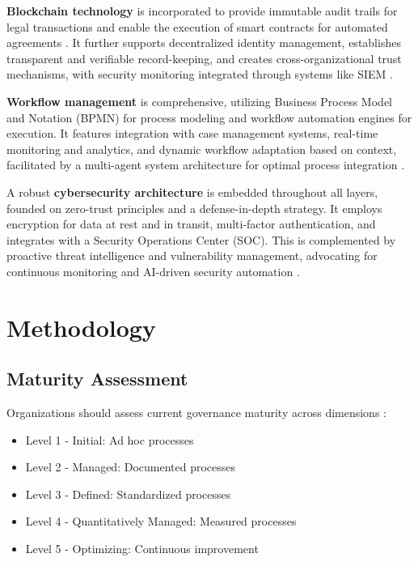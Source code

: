 \documentclass{IET-Conf-Paper}
\begin{document}
    \textbf{Blockchain technology }is incorporated to provide immutable audit trails for legal transactions and enable the execution of smart contracts for automated agreements \cite{nurudeen2024}. 
    It further supports decentralized identity management, establishes transparent and verifiable record-keeping, and creates cross-organizational trust mechanisms, with security monitoring integrated through systems like SIEM \cite{Khairiyah2025Ambidextrous}.
    
    \textbf{Workflow management} is comprehensive, utilizing Business Process Model and Notation (BPMN) for process modeling and workflow automation engines for execution. It features integration with case management systems, real-time monitoring and analytics, and dynamic workflow adaptation based on context, facilitated by a multi-agent system architecture for optimal process integration \cite{Soukaina_Elhasnaoui_2014}.
    
    A robust \textbf{cybersecurity architecture} is embedded throughout all layers, founded on zero-trust principles and a defense-in-depth strategy. It employs encryption for data at rest and in transit, multi-factor authentication, and integrates with a Security Operations Center (SOC). This is complemented by proactive threat intelligence and vulnerability management, advocating for continuous monitoring and AI-driven security automation \cite{Olomola2022Comprehensive}.

\vspace{-3mm}
\section{Methodology}
\subsection{Maturity Assessment}
    Organizations should assess current governance maturity across dimensions \cite{11238924}:
    \begin{itemize}
    \item Level 1 - Initial: Ad hoc processes
    \item Level 2 - Managed: Documented processes
    \item Level 3 - Defined: Standardized processes
    \item Level 4 - Quantitatively Managed: Measured processes
    \item Level 5 - Optimizing: Continuous improvement
    \end{itemize}
\end{document}
